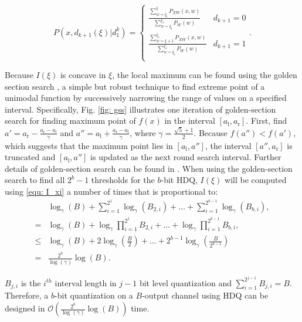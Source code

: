 \documentclass [PhD] {uclathes}
\begin{document}
\begin{equation}
    P\left(x,d_{k+1}(\xi)|d_1^k\right) = 
    \begin{cases}
    \frac{\sum_{w=\xi_l}^{\xi} P_{XW}(x,w)}{\sum_{w=\xi_l}^{\xi_r} P_{W}(w)} & d_{k+1}=0\\
    \frac{\sum_{w=\xi+1}^{\xi_r} P_{XW}(x,w)}{\sum_{w=\xi_l}^{\xi_r} P_{W}(w)} & d_{k+1}=1\\
    \end{cases}.
\end{equation}

Because $I(\xi)$ is concave in $\xi$, the local maximum can be found using the golden section search \cite{Kiefer1953-pc}, a simple but robust technique to find extreme point of a unimodal function by successively narrowing the range of values on a specified interval. Specifically, Fig. \ref{fig: gss} illustrates one iteration of golden-section search for finding maximum point of $f(x)$ in the interval $[a_\text{l},a_{\text{r}}]$. First, find $a'=a_{\text{r}}-\frac{a_\text{r}-a_\text{l}}{\gamma}$ and $a''=a_{\text{l}}+\frac{a_\text{r}-a_\text{l}}{\gamma}$, where $\gamma = \frac{\sqrt{5}+1}{2}$. Because $f(a'')<f(a')$, which suggests that the maximum point lies in $[a_\text{l},a'']$, the interval $[a'',a_\text{r}]$ is truncated and  $[a_\text{l},a'']$ is updated as the next round search interval. Further details of golden-section search can be found in \cite{Kiefer1953-pc}. When using the golden-section search to find all $2^b -1$ thresholds for the $b$-bit HDQ, $I(\xi)$ will be computed using \eqref{equ: I_xi} a number of times that is proportional to: 
\begin{align}
    &\log_{\gamma}(B)+\sum_{i=1}^{2^1}\log_{\gamma}(B_{2,i})+\ldots+\sum_{i=1}^{2^{b-1}}\log_{\gamma}(B_{b,i}),\\
   =&\log_{\gamma}(B)+\log_{\gamma}\prod_{i=1}^{2^1}B_{2,i}+\ldots+\log_{\gamma}\prod_{i=1}^{2^{b-1}}B_{b,i},\\
    \leq&\log_{\gamma}(B)+2\log_{\gamma}\left(\frac{B}{2}\right)+\ldots+2^{b-1}\log_{\gamma}\left(\frac{B}{2^{b-1}}\right)\\=& \frac{2^b}{\log(\gamma)}\log(B).
\end{align}

$B_{j,i}$ is the $i^{th}$ interval length in ${j-1}$ bit level quantization and $\sum_{i=1}^{2^{j-1}}B_{j,i}=B$. Therefore, a $b$-bit quantization on a  $B$-output channel using HDQ can be designed in $\mathcal{O}\left(\frac{2^b}{\log(\gamma)}\log(B)\right)$ time.
\end{document}
